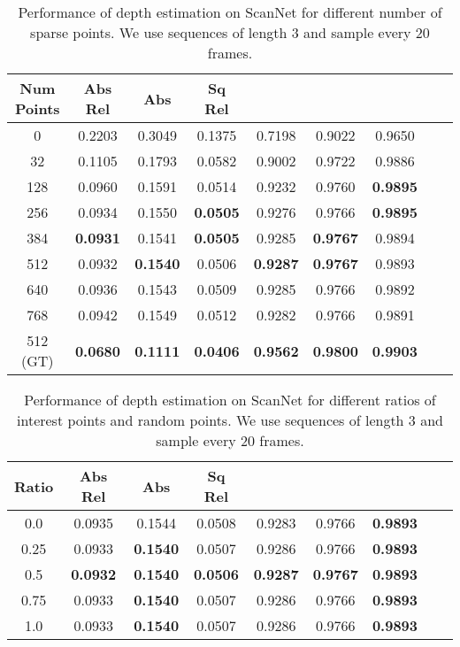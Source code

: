 \documentclass[runningheads]{llncs}
\begin{document}
\begin{table}[ht]
  \caption{Performance of depth estimation on ScanNet for different number of sparse points. We use sequences of length 3 and sample every 20 frames. }
  \centering
\begin{tabular}{ccccccccc}
 \hline 
   Num Points  &Abs Rel  &Abs & Sq Rel & \textbf{}& \textbf{}& \textbf{}\\

    \hline
0 &	0.2203 &	0.3049 &	0.1375 &	0.7198 &	0.9022 &	0.9650\\
32 &	0.1105 &	0.1793 &	0.0582 &	0.9002 &	0.9722 &	0.9886\\
128 &	0.0960 &	0.1591 &	0.0514 &	0.9232&	0.9760&	\textbf{0.9895}\\
256 &	0.0934&	0.1550&	\textbf{0.0505}&	0.9276&	0.9766&	\textbf{0.9895}\\
384 &	\textbf{0.0931}&	0.1541&	\textbf{0.0505}&	0.9285&	\textbf{0.9767}&	0.9894\\
512 &	0.0932 & \textbf{0.1540} & 0.0506 &  \textbf{0.9287} & \textbf{0.9767} & 0.9893 \\
640 &	0.0936&	0.1543&	0.0509&	0.9285&	0.9766&	0.9892\\
768 &	0.0942&	0.1549&	0.0512&	0.9282&	0.9766&	0.9891\\
\hline
512 (GT) &	\textbf{0.0680} & \textbf{0.1111} & \textbf{0.0406} &  \textbf{0.9562} & \textbf{0.9800} & \textbf{0.9903} \\
\hline
  \end{tabular}
\label{tablepoints}
\end{table}





\begin{table}[h]
  \caption{Performance of depth estimation on ScanNet for different ratios of interest points and random points. We use sequences of length 3 and sample every 20 frames. }
  \centering
\begin{tabular}{ccccccccc}
 \hline 
   Ratio  &Abs Rel  &Abs & Sq Rel & \textbf{}& \textbf{}& \textbf{}\\
    \hline
0.0 &	0.0935&	0.1544&	0.0508&	0.9283&	0.9766&	\textbf{0.9893}\\
0.25 &0.0933&	\textbf{0.1540}&	0.0507&	0.9286&	0.9766&	\textbf{0.9893}\\
0.5 &	\textbf{0.0932} & \textbf{0.1540} & \textbf{0.0506} &  \textbf{0.9287} & \textbf{0.9767} & \textbf{0.9893} \\
0.75 &	0.0933& \textbf{0.1540}& 0.0507& 0.9286& 0.9766& \textbf{0.9893}\\
1.0 &	0.0933&	\textbf{0.1540}&	0.0507&	0.9286&	0.9766&	\textbf{0.9893}\\
\hline
  \end{tabular}
\label{tableratio}
\end{table}
\end{document}
